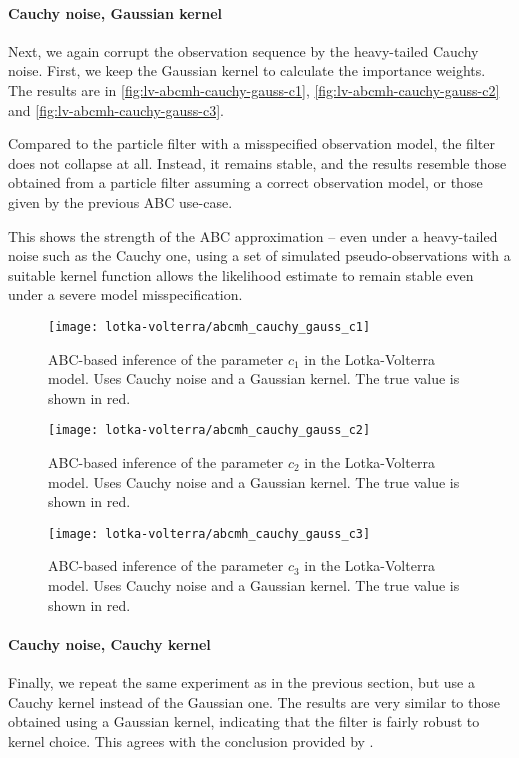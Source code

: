 \paragraph{Cauchy noise, Gaussian kernel}
Next, we again corrupt the observation sequence by the heavy-tailed Cauchy noise. First, we keep the Gaussian kernel to calculate the importance weights. The results are in \autoref{fig:lv-abcmh-cauchy-gauss-c1}, \autoref{fig:lv-abcmh-cauchy-gauss-c2} and \autoref{fig:lv-abcmh-cauchy-gauss-c3}.

Compared to the particle filter with a misspecified observation model, the filter does not collapse at all. Instead, it remains stable, and the results resemble those obtained from a particle filter assuming a correct observation model, or those given by the previous ABC use-case.

This shows the strength of the ABC approximation -- even under a heavy-tailed noise such as the Cauchy one, using a set of simulated pseudo-observations with a suitable kernel function allows the likelihood estimate to remain stable even under a severe model misspecification.

\begin{figure}[htp]
    \centering
    \texttt{[image: lotka-volterra/abcmh\_cauchy\_gauss\_c1]}
    \caption{ABC-based inference of the parameter $c_1$ in the Lotka-Volterra model. Uses Cauchy noise and a Gaussian kernel. The true value is shown in red.}
    \label{fig:lv-abcmh-cauchy-gauss-c1}
\end{figure}

\begin{figure}[htp]
    \centering
    \texttt{[image: lotka-volterra/abcmh\_cauchy\_gauss\_c2]}
    \caption{ABC-based inference of the parameter $c_2$ in the Lotka-Volterra model. Uses Cauchy noise and a Gaussian kernel. The true value is shown in red.}
    \label{fig:lv-abcmh-cauchy-gauss-c2}
\end{figure}

\begin{figure}[htp]
    \centering
    \texttt{[image: lotka-volterra/abcmh\_cauchy\_gauss\_c3]}
    \caption{ABC-based inference of the parameter $c_3$ in the Lotka-Volterra model. Uses Cauchy noise and a Gaussian kernel. The true value is shown in red.}
    \label{fig:lv-abcmh-cauchy-gauss-c3}
\end{figure}

\paragraph{Cauchy noise, Cauchy kernel}
Finally, we repeat the same experiment as in the previous section, but use a Cauchy kernel instead of the Gaussian one. The results are very similar to those obtained using a Gaussian kernel, indicating that the filter is fairly robust to kernel choice. This agrees with the conclusion provided by \cite{dedecius}.


